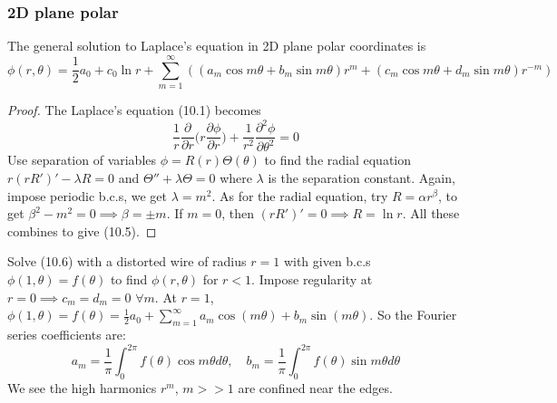 \documentclass[a4paper]{article}
\begin{document}
\subsubsection{2D plane polar}
\begin{prop}
The general solution to Laplace's equation in 2D plane polar coordinates is
\begin{equation}
\phi(r,\theta)=\frac{1}{2}a_0+c_0\ln r+\sum_{m=1}^\infty((a_m\cos m\theta+b_m\sin m\theta)r^m+(c_m\cos m\theta+d_m\sin m\theta)r^{-m})\tag{10.5}
\end{equation}
\end{prop}
\begin{proof}
The Laplace's equation (10.1) becomes
\begin{equation}
    \frac{1}{r}\frac{\partial}{\partial r}\bigg(r\frac{\partial\phi}{\partial r}\bigg)+\frac{1}{r^2}\frac{\partial^2\phi}{\partial\theta^2}=0\tag{10.6}
\end{equation}
Use separation of variables $\phi=R(r)\Theta(\theta)$ to find the radial equation $r(rR')'-\lambda R=0$ and $\Theta''+\lambda\Theta=0$ where $\lambda$ is the separation constant. Again, impose periodic b.c.s, we get $\lambda=m^2$. As for the radial equation, try $R=\alpha r^\beta$, to get $\beta^2-m^2=0\implies\beta=\pm m$. If $m=0$, then $(rR')'=0\implies R=\ln r$. All these combines to give (10.5). 
\end{proof}
\begin{eg}
Solve (10.6) with a distorted wire of radius $r=1$ with given b.c.s $\phi(1,\theta)=f(\theta)$ to find $\phi(r,\theta)$ for $r<1$. Impose regularity at $r=0\implies c_m=d_m=0$ $\forall m$. At $r=1$, $\phi(1,\theta)=f(\theta)=\frac{1}{2}a_0+\sum_{m=1}^\infty a_m\cos(m\theta)+b_m\sin(m\theta)$. So the Fourier series coefficients are:
$$a_m=\frac{1}{\pi}\int_0^{2\pi}f(\theta)\cos m\theta d\theta,\quad b_m=\frac{1}{\pi}\int_0^{2\pi}f(\theta)\sin m\theta d\theta$$
We see the high harmonics $r^m$, $m>>1$ are confined near the edges.
\end{eg}
\end{document}
